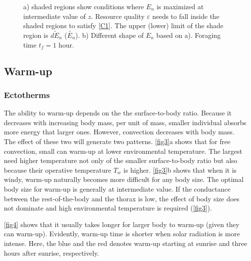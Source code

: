 \begin{figure}
\begin{center}
\caption{
	a) shaded regions show conditions where $E_n$ is maximized at intermediate value of $z$.
	Resource quality $\varepsilon$ needs to fall inside the shaded regions to satisfy \cref{C1}.
	The upper (lower) limit of the shade region is $\widetilde{dE_n}$ ($\widetilde{E_n}$).  
	b) Different shape of $E_n$ based on a).
	Foraging time $t_f = 1$ hour.
}%
\label{fig2}
\end{center}
\end{figure}

\subsection*{Warm-up}
\subsubsection*{Ectotherms}
The ability to warm-up depends on the the surface-to-body ratio.
Because it decreases with increasing body mass, per unit of mass, smaller individual absorbs more energy that larger ones.
However, convection decreases with body mass. 
The effect of these two will generate two patterns.
\cref{fig3}a shows that for free convection, small can warm-up at lower environmental temperature.
The largest need higher temperature not only of the smaller surface-to-body ratio but also because their operative temperature $T_w$ is higher.
\cref{fig3}b shows that when it is windy, warm-up naturally becomes more difficult for any body size.
The optimal body size for warm-up is generally at intermediate value.
If the conductance between the rest-of-the-body and the thorax is low, the effect of body size does not dominate and high environmental temperature is required (\cref{fig3}).

\cref{fig4} shows that it usually takes longer for larger body to warm-up (given they can warm-up).
Evidently, warm-up time is shorter when solar radiation is more intense. 
Here, the blue and the red denotes warm-up starting at sunrise and three hours after sunrise, respectively. 

